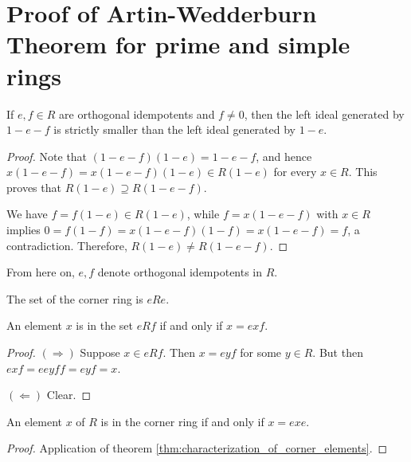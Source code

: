 \section{Proof of Artin-Wedderburn Theorem for prime and simple rings}
  \begin{theorem}
    \label{thm:one_sub_e_larger_span_on_sub_e_sub_f}
    If $e, f \in R$ are orthogonal idempotents and $f \neq 0$, then the left ideal generated by $1 - e - f$ is strictly smaller than the left ideal generated by $1 - e$.
  \end{theorem}
  \begin{proof}
    Note that $(1 - e - f)(1 - e) = 1 - e - f$, and hence
    $x(1 - e - f) = x(1 - e - f)(1 - e) \in R(1 - e)$
    for every $x \in R$. This proves that $R(1 - e) \supseteq R(1 - e - f)$.
    
    We have $f = f(1 - e) \in R(1 - e)$, while $f = x(1 - e - f)$ with $x \in R$ implies
    $0 = f(1 - f) = x(1 - e - f)(1 - f) = x(1 - e - f) = f$,
    a contradiction. Therefore, $R(1 - e) \neq R(1 - e - f)$.
  \end{proof}

  From here on, $e, f$ denote orthogonal idempotents in $R$.

  \begin{definition}
    \label{def:corner_ring}
    The set of the corner ring is $eRe$.
  \end{definition}

  \begin{theorem}
    \label{thm:characterization_of_corner_elements}
    An element $x$ is in the set $e R f$ if and only if $x = e x f$.
  \end{theorem}
  \begin{proof}
    $(\Rightarrow)$ Suppose $x \in e R f$. Then $x = e y f$ for some $y \in R$. But then $e x f = e e y f f = e y f = x$.

    $(\Leftarrow)$ Clear.
  \end{proof}
    

  \begin{theorem}
    \label{thm:characterization_of_corner_ring_elements}
    An element $x$ of $R$ is in the corner ring if and only if $x = e x e$.
  \end{theorem}
  \begin{proof}
    Application of theorem \ref{thm:characterization_of_corner_elements}.
  \end{proof}

